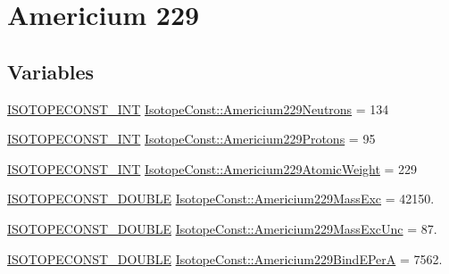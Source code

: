 \hypertarget{group___isotope_const-_americium-_am229}{}\section{Americium 229}
\label{group___isotope_const-_americium-_am229}
\subsection*{Variables}
\begin{DoxyCompactItemize}
\item 
\mbox{\hyperlink{group___isotope_const-_macros_ga5f18360b3e99483a35c32d789e62621c}{I\+S\+O\+T\+O\+P\+E\+C\+O\+N\+S\+T\+\_\+\+I\+NT}} \mbox{\hyperlink{group___isotope_const-_americium-_am229_ga810d356e053f17620ce1c55ebf44049b}{Isotope\+Const\+::\+Americium229\+Neutrons}} = 134
\item 
\mbox{\hyperlink{group___isotope_const-_macros_ga5f18360b3e99483a35c32d789e62621c}{I\+S\+O\+T\+O\+P\+E\+C\+O\+N\+S\+T\+\_\+\+I\+NT}} \mbox{\hyperlink{group___isotope_const-_americium-_am229_ga8bae3b83757fe683b243bc087f657c67}{Isotope\+Const\+::\+Americium229\+Protons}} = 95
\item 
\mbox{\hyperlink{group___isotope_const-_macros_ga5f18360b3e99483a35c32d789e62621c}{I\+S\+O\+T\+O\+P\+E\+C\+O\+N\+S\+T\+\_\+\+I\+NT}} \mbox{\hyperlink{group___isotope_const-_americium-_am229_ga3556c0acbb325ad385797be5b1e92b2f}{Isotope\+Const\+::\+Americium229\+Atomic\+Weight}} = 229
\item 
\mbox{\hyperlink{group___isotope_const-_macros_ga8f45a7272ce02c0b4c65c44636ed719a}{I\+S\+O\+T\+O\+P\+E\+C\+O\+N\+S\+T\+\_\+\+D\+O\+U\+B\+LE}} \mbox{\hyperlink{group___isotope_const-_americium-_am229_ga90540e7cddd7ee3ebf4d5e31228d0e25}{Isotope\+Const\+::\+Americium229\+Mass\+Exc}} = 42150.
\item 
\mbox{\hyperlink{group___isotope_const-_macros_ga8f45a7272ce02c0b4c65c44636ed719a}{I\+S\+O\+T\+O\+P\+E\+C\+O\+N\+S\+T\+\_\+\+D\+O\+U\+B\+LE}} \mbox{\hyperlink{group___isotope_const-_americium-_am229_ga6e218ef063fffef282d8e3e5ab6814bd}{Isotope\+Const\+::\+Americium229\+Mass\+Exc\+Unc}} = 87.
\item 
\mbox{\hyperlink{group___isotope_const-_macros_ga8f45a7272ce02c0b4c65c44636ed719a}{I\+S\+O\+T\+O\+P\+E\+C\+O\+N\+S\+T\+\_\+\+D\+O\+U\+B\+LE}} \mbox{\hyperlink{group___isotope_const-_americium-_am229_ga51ae936c431222627db8a5bc02c514c9}{Isotope\+Const\+::\+Americium229\+Bind\+E\+PerA}} = 7562.
\item 

\end{DoxyCompactItemize}
